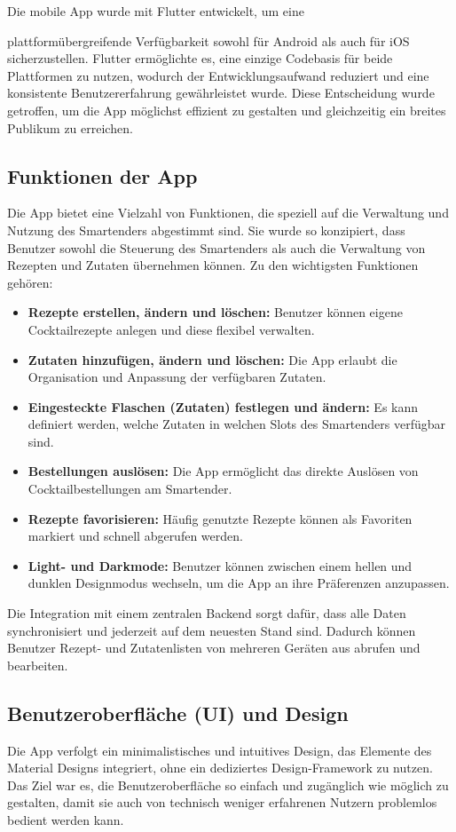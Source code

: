 Die mobile App wurde mit Flutter\cite{flutter} entwickelt, um eine 

plattformübergreifende Verfügbarkeit sowohl für Android als auch für iOS sicherzustellen. Flutter ermöglichte es, eine einzige Codebasis für beide Plattformen zu nutzen, wodurch der Entwicklungsaufwand reduziert und eine konsistente Benutzererfahrung gewährleistet wurde. Diese Entscheidung wurde getroffen, um die App möglichst effizient zu gestalten und gleichzeitig ein breites Publikum zu erreichen.

\subsection{Funktionen der App}
Die App bietet eine Vielzahl von Funktionen, die speziell auf die Verwaltung und Nutzung des Smartenders abgestimmt sind. Sie wurde so konzipiert, dass Benutzer sowohl die Steuerung des Smartenders als auch die Verwaltung von Rezepten und Zutaten übernehmen können. Zu den wichtigsten Funktionen gehören:

\begin{itemize}
    \item \textbf{Rezepte erstellen, ändern und löschen:} Benutzer können eigene Cocktailrezepte anlegen und diese flexibel verwalten.
    \item \textbf{Zutaten hinzufügen, ändern und löschen:} Die App erlaubt die Organisation und Anpassung der verfügbaren Zutaten.
    \item \textbf{Eingesteckte Flaschen (Zutaten) festlegen und ändern:} Es kann definiert werden, welche Zutaten in welchen Slots des Smartenders verfügbar sind.
    \item \textbf{Bestellungen auslösen:} Die App ermöglicht das direkte Auslösen von Cocktailbestellungen am Smartender.
    \item \textbf{Rezepte favorisieren:} Häufig genutzte Rezepte können als Favoriten markiert und schnell abgerufen werden.
    \item \textbf{Light- und Darkmode:} Benutzer können zwischen einem hellen und dunklen Designmodus wechseln, um die App an ihre Präferenzen anzupassen.
\end{itemize}
Die Integration mit einem zentralen Backend sorgt dafür, dass alle Daten synchronisiert
und jederzeit auf dem neuesten Stand sind. Dadurch können Benutzer Rezept- und
Zutatenlisten von mehreren Geräten aus abrufen und bearbeiten.

\subsection{Benutzeroberfläche (UI) und Design}
Die App verfolgt ein minimalistisches und intuitives Design, 
das Elemente des Material Designs integriert, ohne ein dediziertes Design-Framework\cite{materialdesign} 
zu nutzen. Das Ziel war es, die Benutzeroberfläche so einfach und zugänglich wie möglich zu gestalten, damit sie auch von technisch weniger erfahrenen Nutzern problemlos bedient werden kann.

